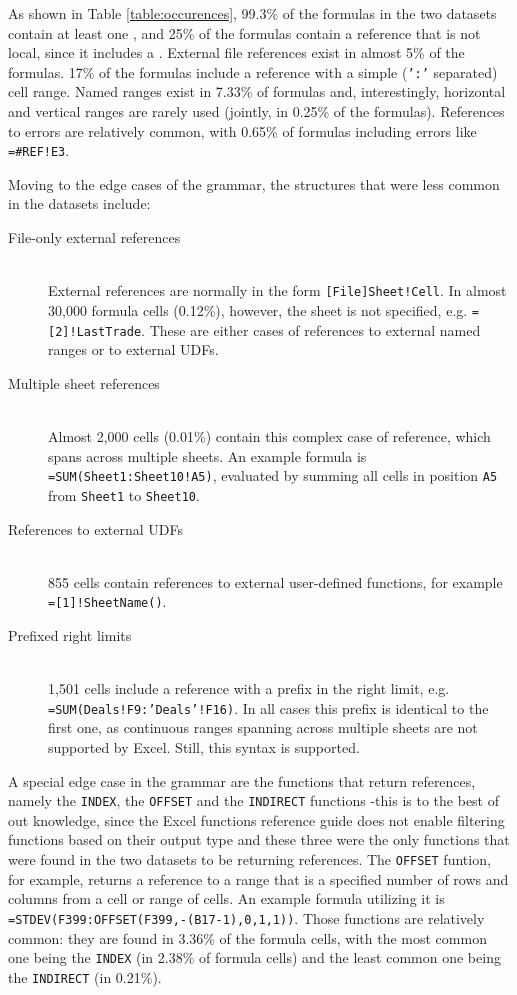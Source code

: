 \documentclass[conference]{IEEEtran}
\begin{document}
As shown in Table \ref{table:occurences}, 99.3\% of the formulas in the two datasets contain at least one , and 25\% of the formulas contain a reference that is not local, since it includes a . External file references exist in almost 5\% of the formulas. 17\% of the formulas include a reference with a simple (\texttt{':'} separated) cell range. Named ranges exist in 7.33\% of formulas and, interestingly, horizontal and vertical ranges are rarely used (jointly, in 0.25\% of the formulas). References to errors are relatively common, with 0.65\% of formulas including errors like \texttt{=\#REF!E3}.

Moving to the edge cases of the grammar, the structures that were less common in the datasets include:

\begin{description}
	\item[File-only external references] \hfill \\
		External references are normally in the form \texttt{[File]Sheet!Cell}. In almost 30,000 formula cells (0.12\%), however, the sheet is not specified, e.g. \texttt{=[2]!LastTrade}. These are either cases of references to external named ranges or to external UDFs.
	\item[Multiple sheet references] \hfill \\
	 Almost 2,000 cells (0.01\%) contain this complex case of reference, which spans across multiple sheets. An example formula is \texttt{=SUM(Sheet1:Sheet10!A5)}, evaluated by summing all cells in position \texttt{A5} from \texttt{Sheet1} to \texttt{Sheet10}.
	\item[References to external UDFs] \hfill \\
	855 cells contain references to external user-defined functions, for example \texttt{=[1]!SheetName()}.
	\item[Prefixed right limits] \hfill \\
	1,501 cells include a reference with a prefix in the right limit, e.g. \texttt{=SUM(Deals!F9:'Deals'!F16)}. In all cases this prefix is identical to the first one, as continuous ranges spanning across multiple sheets are not supported by Excel. Still, this syntax is supported.
\end{description}

A special edge case in the grammar are the functions that return references, namely the \texttt{INDEX}, the \texttt{OFFSET} and the \texttt{INDIRECT} functions -this is to the best of out knowledge, since the Excel functions reference guide does not enable filtering functions based on their output type and these three were the only functions that were found in the two datasets to be returning references. The \texttt{OFFSET} funtion, for example, returns a reference to a range that is a specified number of rows and columns from a cell or range of cells. An example formula utilizing it is \texttt{=STDEV(F399:OFFSET(F399,-(B17-1),0,1,1))}. Those functions are relatively common: they are found in 3.36\% of the formula cells, with the most common one being the \texttt{INDEX} (in 2.38\% of formula cells) and the least common one being the \texttt{INDIRECT} (in 0.21\%).
\end{document}
